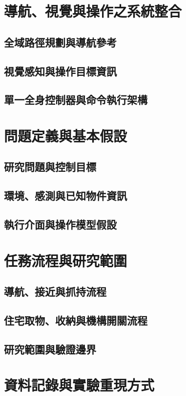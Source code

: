 \section{導航、視覺與操作之系統整合}
\subsection{全域路徑規劃與導航參考}
\subsection{視覺感知與操作目標資訊}
\subsection{單一全身控制器與命令執行架構}

\section{問題定義與基本假設}
\subsection{研究問題與控制目標}
\subsection{環境、感測與已知物件資訊}
\subsection{執行介面與操作模型假設}

\section{任務流程與研究範圍}
\subsection{導航、接近與抓持流程}
\subsection{住宅取物、收納與機構開關流程}
\subsection{研究範圍與驗證邊界}
\section{資料記錄與實驗重現方式}

